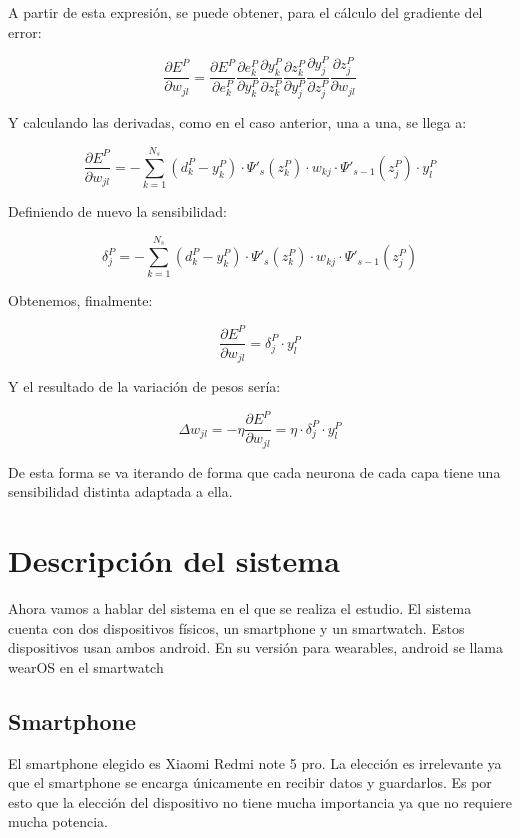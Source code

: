 \documentclass[12pt]{article}
\numberwithin{equation}{section}
\begin{document}
A partir de esta expresión, se puede obtener, para el cálculo del gradiente del error:

\begin{equation}
\frac{\partial E^P}{\partial w_{jl}} = \frac{\partial E^P}{\partial e_{k}^P} \frac{\partial e^P_k}{\partial y_{k}^P} \frac{\partial y^P_k}{\partial z_{k}^P} \frac{\partial z^P_k}{\partial y_j^P} \frac{\partial y^P_j}{\partial z_j^P} \frac{\partial z^P_j}{\partial w_{jl}}
\end{equation}

Y calculando las derivadas, como en el caso anterior, una a una, se llega a:

\begin{equation}
\frac{\partial E^P}{\partial w_{jl}} =-\sum _{k=1}^{N_s}(d_k^P-y_k^P) \cdot \Psi ' _s(z_k^P) \cdot w_{kj} \cdot \Psi '_{s-1}(z_j^P) \cdot y_l^P
\end{equation}

Definiendo de nuevo la sensibilidad:

\begin{equation}
\delta _j^P = -\sum _{k=1}^{N_s}(d_k^P-y_k^P) \cdot \Psi ' _s(z_k^P) \cdot w_{kj} \cdot \Psi '_{s-1}(z_j^P)
\end{equation}

Obtenemos, finalmente:

\begin{equation}
\frac{\partial E^P}{\partial w_{jl}} = \delta _j^P \cdot y_l^P
\end{equation}

Y el resultado de la variación de pesos sería: 

\begin{equation}
\Delta w_{jl} = -\eta \frac{\partial E^P}{\partial w_{jl}} = \eta \cdot \delta _j^P \cdot y_l^P
\end{equation}

De esta forma se va iterando de forma que cada neurona de cada capa tiene una sensibilidad distinta adaptada a ella.


\newpage
\section{Descripción del sistema}
Ahora vamos a hablar del sistema en el que se realiza el estudio. El sistema cuenta con dos dispositivos físicos, un smartphone y un smartwatch. Estos dispositivos usan ambos android. En su versión para wearables, android se llama wearOS en el smartwatch
\subsection{Smartphone}
El smartphone elegido es Xiaomi Redmi note 5 pro. La elección es irrelevante ya que el smartphone se encarga únicamente en recibir datos y guardarlos. Es por esto que la elección del dispositivo no tiene mucha importancia ya que no requiere mucha potencia.
\end{document}
